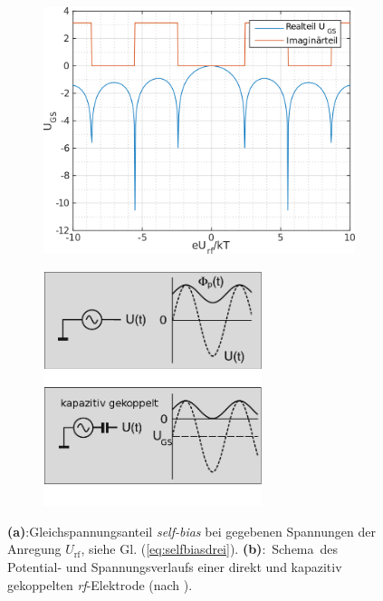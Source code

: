 \documentclass[numbers=noenddot,a4paper,notitlepage,twoside,BCOR15mm]{scrbook}
\newcommand{\ix}[1]{_\text{#1}}
\newcommand{\tilt}[1]{\textit{#1}}
\newcommand{\fett}[1]{\textbf{#1}}
\begin{document}
						\begin{figure}[!t]
							\centering
							\begin{subfigure}[t]{0.45\textwidth}
								\centering
								\includegraphics[width=\textwidth,height=0.8\textwidth]{figs/selfbiasselbst.png}
								\caption{}
								\label{img:imagundreal}
							\end{subfigure}
							\begin{subfigure}[t]{0.45\textwidth}
								\centering
								\includegraphics[width=0.7\textwidth,height=0.7\textwidth]{figs/kapazitivekopplungohneschemapiel.png}
								\vspace{-0.1cm}
								\caption{}
								\label{img:kapazitivgekoppelt}
							\end{subfigure}
							\caption{\fett{(a)}:Gleichspannungsanteil \tilt{self-bias} bei gegebenen Spannungen der Anregung $U\ix{rf}$, siehe Gl. (\ref{eq:selfbiasdrei}). \mbox{\fett{(b)}: Schema des} Potential- und Spannungsverlaufs einer direkt und kapazitiv gekoppelten \tilt{rf}-Elektrode (nach \cite{Piel10}).}
						\end{figure}
\end{document}
